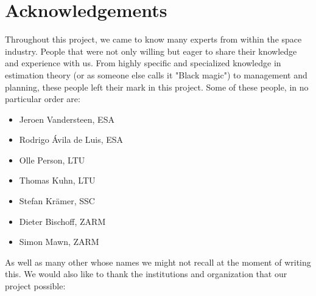 \section*{Acknowledgements} \markboth{}{}

Throughout this project, we came to know many experts from within the space industry. People that were not only willing but eager to share their knowledge and experience with us. From highly specific and specialized knowledge in estimation theory (or as someone else calls it "Black magic") to management and planning, these people left their mark in this project. Some of these people, in no particular order are:
\begin{itemize}
	\item Jeroen Vandersteen, ESA
	\item Rodrigo Ávila de Luis, ESA
	\item Olle Person, LTU
	\item Thomas Kuhn, LTU
	\item Stefan Krämer, SSC
	\item Dieter Bischoff, ZARM
	\item Simon Mawn, ZARM
\end{itemize}
 As well as many other whose names we might not recall at the moment of writing this.
 \newline
 We would also like to thank the institutions and organization that our project possible:
 
